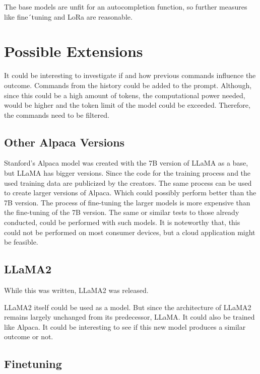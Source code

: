 The base models are unfit for an autocompletion function, so further measures like fine´tuning and LoRa are reasonable.


\section{Possible Extensions}
It could be interesting to investigate if and how previous commands influence the outcome. Commands from the history could be added to the prompt. Although, since this could be a high amount of tokens, the computational power needed, would be higher and the token limit of the model could be exceeded. Therefore, the commands need to be filtered. 




\subsection{Other Alpaca Versions}


Stanford's Alpaca model was created with the 7B version of LLaMA as a base, but LLaMA has bigger versions.  Since the code for the training process and the used training data are publicized by the creators. The same process can be used to create larger versions of Alpaca. Which could possibly perform better than the 7B version. The process of fine-tuning the larger models is more expensive than the fine-tuning of the 7B version. The same or similar tests to those already conducted, could be performed with such models. It is noteworthy that, this could not be performed on most consumer devices, but a cloud application might be feasible.



\subsection{LLaMA2}


While this was written, LLaMA2 was released.\cite{touvron2023llama2}

LLaMA2 itself could be used as a model. But since the architecture of LLaMA2 remains largely unchanged from its predecessor, LLaMA. It could also be trained like Alpaca. It could be interesting to see if this new model produces a similar outcome or not.



\subsection{Finetuning}


